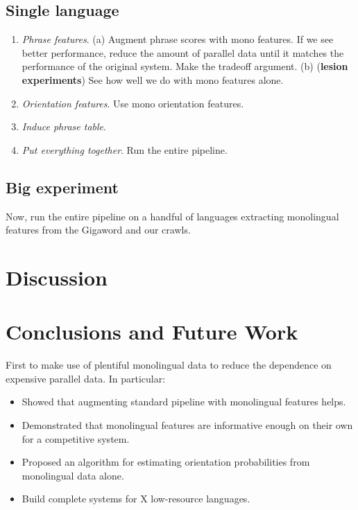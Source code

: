 \documentclass[11pt]{article}
\begin{document}
\subsection{Single language}

\begin{enumerate}
\item {\em Phrase features}.  (a) Augment phrase scores with mono features.  If we see better performance, reduce the amount of parallel data until it matches the performance of the original system.  Make the tradeoff argument.  (b) ({\bf lesion experiments}) See how well we do with mono features alone.
\item {\em Orientation features}. Use mono orientation features.
\item {\em Induce phrase table}.
\item {\em Put everything together}.  Run the entire pipeline.
\end{enumerate}

\subsection{Big experiment}

Now, run the entire pipeline on a handful of languages extracting monolingual features from the Gigaword and our crawls.

\section{Discussion} \label{sect:disc}

\section{Conclusions and Future Work} \label{sect:conc}

First to make use of plentiful monolingual data to reduce the dependence on expensive parallel data.  In particular:

\begin{itemize}
\item Showed that augmenting standard pipeline with monolingual features helps.
\item Demonstrated that monolingual features are informative enough on their own for a competitive system.
\item Proposed an algorithm for estimating orientation probabilities from monolingual data alone.
\item Build complete systems for X low-resource languages.
\end{itemize}




\end{document}
